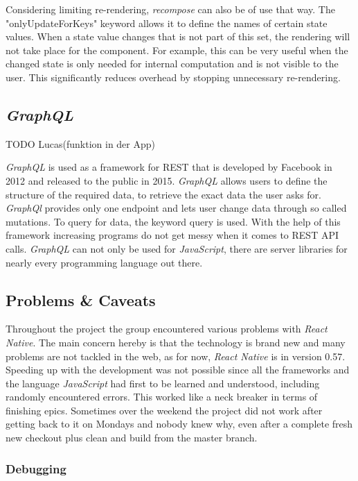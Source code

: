 \newline
Considering limiting re-rendering, \textit{recompose} can also be of use that way. The "onlyUpdateForKeys" keyword allows it to define the names of certain state values. When a state value changes that is not part of this set, the rendering will not take place for the component. For example, this can be very useful when the changed state is only needed for internal computation and is not visible to the user. This significantly reduces overhead by stopping unnecessary re-rendering.

\subsection{\textit{GraphQL}}
\label{ssec:graphql}

TODO Lucas(funktion in der App)

\textit{GraphQL} is used as a framework for REST that is developed by Facebook in 2012 and released to the public in 2015. \textit{GraphQL} allows users to define the structure of the required data, to retrieve the exact data the user asks for. \textit{GraphQl} provides only one endpoint and lets user change data through so called mutations. To query for data, the keyword query is used. With the help of this framework increasing programs do not get messy when it comes to REST API calls. \textit{GraphQL} can not only be used for \textit{JavaScript}, there are server libraries for nearly every programming language out there.


\subsection{Problems \& Caveats}
\label{ssec:problems}

Throughout the project the group encountered various problems with \textit{React Native}. The main concern hereby is that the technology is brand new and many problems are not tackled in the web, as for now, \textit{React Native} is in version 0.57. Speeding up with the development was not possible since all the frameworks and the language \textit{JavaScript} had first to be learned and understood, including randomly encountered errors. This worked like a neck breaker in terms of finishing epics. Sometimes over the weekend the project did not work after getting back to it on Mondays and nobody knew why, even after a complete fresh new checkout plus clean and build from the master branch.

\subsubsection{Debugging}
\label{sssec:debugging}

